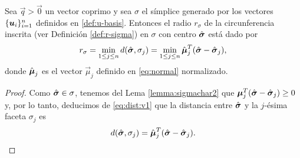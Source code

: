 \begin{theorem}
	\label{lemma:sigma-radius}
	Sea $\vec{q} > \vec{0}$ un vector coprimo y sea $\sigma$ el símplice generado por los vectores
	$\lbrace \boldsymbol{u}_i \rbrace_{i=1}^{n}$ definidos en \eqref{def:u-basis}. Entonces el radio $r_\sigma$ de
	la circunferencia inscrita (ver Definición \ref{def:r-sigma}) en $\sigma$ con centro
	$\hat{\boldsymbol{ \sigma }}$ está dado por
	\begin{equation*}
		r_\sigma = \min_{1 \leq j \leq n} d(\hat{\boldsymbol{ \sigma }}, \sigma_j)
		= \min_{1 \leq j \leq n} \hat{\boldsymbol{\mu}}_j^T(\hat{\boldsymbol{ \sigma }} - \hat{\boldsymbol{ \sigma }}_j),
	\end{equation*}
	donde $\hat{\boldsymbol{\mu}}_j$ es el vector $\vec{\mu}_j$ definido en \eqref{eq:normal} normalizado.
\end{theorem}
\begin{proof}
	Como $\hat{\boldsymbol{ \sigma }} \in \sigma$, tenemos del Lema \ref{lemma:sigmachar2} que
	$\boldsymbol{\mu}_j^T(\hat{\boldsymbol{ \sigma }} - \hat{\boldsymbol{ \sigma }}_j) \geq 0$ y, por lo tanto, deducimos de \eqref{eq:dist:v1}
	que la distancia entre $\hat{\boldsymbol{ \sigma }}$ y la $j$-ésima faceta $\sigma_j$ es
	\begin{equation}
		\label{eq:dist}
		d(\hat{\boldsymbol{ \sigma }}, \sigma_j) = \hat{\boldsymbol{\mu}}_j^T(\hat{\boldsymbol{ \sigma }} - \hat{\boldsymbol{ \sigma }}_j).
	\end{equation}


\end{proof}
